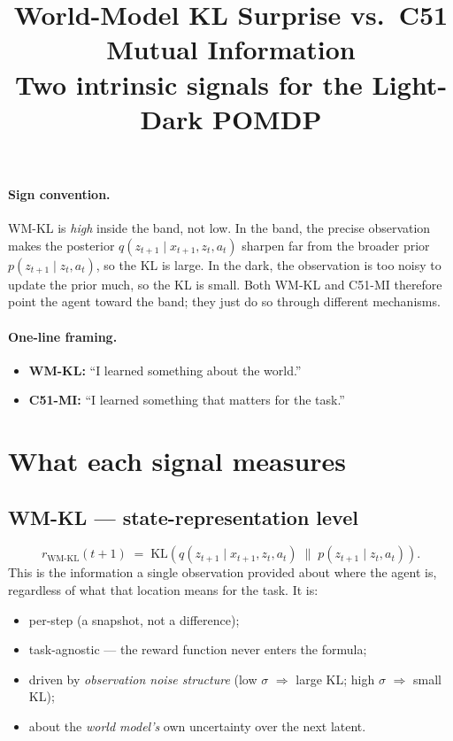 \documentclass[11pt]{article}
\title{World-Model KL Surprise vs.\ C51 Mutual Information\\
\large Two intrinsic signals for the Light-Dark POMDP}
\author{}
\date{}
\begin{document}
\maketitle

\paragraph{Sign convention.}
WM-KL is \emph{high} inside the band, not low. In the band, the precise
observation makes the posterior $q(z_{t+1}\mid x_{t+1}, z_t, a_t)$ sharpen
far from the broader prior $p(z_{t+1}\mid z_t, a_t)$, so the KL is large. In
the dark, the observation is too noisy to update the prior much, so the KL is
small. Both WM-KL and C51-MI therefore point the agent toward the band; they
just do so through different mechanisms.

\paragraph{One-line framing.}
\begin{itemize}
  \item \textbf{WM-KL:} ``I learned something about the world.''
  \item \textbf{C51-MI:} ``I learned something that matters for the task.''
\end{itemize}

\section{What each signal measures}

\subsection*{WM-KL --- state-representation level}
\[
  r_{\mathrm{WM\text{-}KL}}(t{+}1)
  \;=\;
  \mathrm{KL}\!\left(
    q(z_{t+1}\mid x_{t+1}, z_t, a_t)
    \;\big\|\;
    p(z_{t+1}\mid z_t, a_t)
  \right).
\]
This is the information a single observation provided about where the agent
is, regardless of what that location means for the task. It is:
\begin{itemize}
  \item per-step (a snapshot, not a difference);
  \item task-agnostic --- the reward function never enters the formula;
  \item driven by \emph{observation noise structure} (low $\sigma$ $\Rightarrow$ large KL; high $\sigma$ $\Rightarrow$ small KL);
  \item about the \emph{world model's} own uncertainty over the next latent.
\end{itemize}
\end{document}
